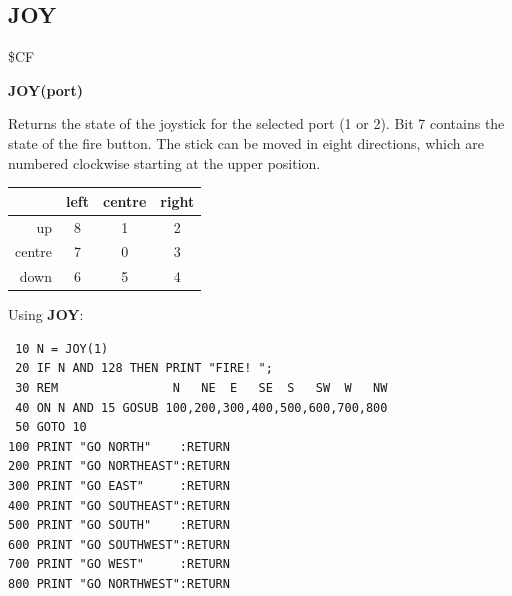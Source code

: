 \subsection{JOY}
\begin{description}[leftmargin=2cm,style=nextline]
\item [Token:] \$CF
\item [Format:] {\bf JOY(port)}
\item [Usage:] Returns the state of the
               joystick for the selected port (1 or 2).
               Bit 7 contains the state of the fire button.
               The stick can be moved in eight directions, which
               are numbered clockwise starting at the upper position.

\ttfamily
{\setlength{\tabcolsep}{1mm}
\begin{tabular}{|r|c|c|c|}
\hline
&  left  & centre & right \\
\hline
up     &  8 &    1  & 2 \\
centre &  7 &    0  & 3 \\
down   &  6 &    5  & 4 \\
\hline
\end{tabular}
}

\item [Example:] Using {\bf JOY}:
\begin{tcolorbox}[colback=black,coltext=white]
\verbatimfont{\codefont}
\begin{verbatim}
 10 N = JOY(1)
 20 IF N AND 128 THEN PRINT "FIRE! ";
 30 REM                N   NE  E   SE  S   SW  W   NW
 40 ON N AND 15 GOSUB 100,200,300,400,500,600,700,800
 50 GOTO 10
100 PRINT "GO NORTH"    :RETURN
200 PRINT "GO NORTHEAST":RETURN
300 PRINT "GO EAST"     :RETURN
400 PRINT "GO SOUTHEAST":RETURN
500 PRINT "GO SOUTH"    :RETURN
600 PRINT "GO SOUTHWEST":RETURN
700 PRINT "GO WEST"     :RETURN
800 PRINT "GO NORTHWEST":RETURN
\end{verbatim}
\end{tcolorbox}
\end{description}


\newpage
